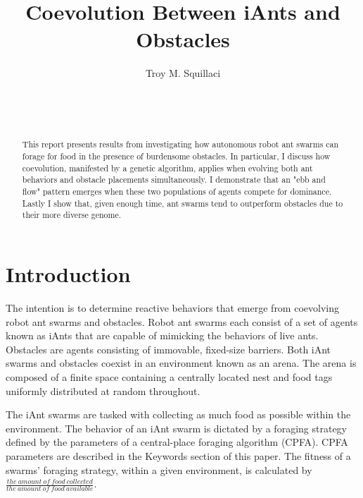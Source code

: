 \documentclass{acm_proc_article-sp}
\begin{document}
\title{Coevolution Between iAnts and Obstacles
}

\author{
\alignauthor
Troy M. Squillaci\\
       \\
       \\
       \\
}

\maketitle

\begin{abstract}

This report presents results from investigating how autonomous robot ant swarms can forage for food in the presence of burdensome obstacles. In particular, I discuss how coevolution, manifested by a genetic algorithm, applies when evolving both ant behaviors and obstacle placements simultaneously. I demonstrate that an "ebb and flow" pattern emerges when these two populations of agents compete for dominance. Lastly I show that, given enough time, ant swarms tend to outperform obstacles due to their more diverse genome.

\end{abstract}

\section{Introduction}
The intention is to determine reactive behaviors that emerge from coevolving robot ant swarms and obstacles. Robot ant swarms each consist of a set of agents known as iAnts that are capable of mimicking the behaviors of live ants. Obstacles are agents consisting of immovable, fixed-size barriers. Both iAnt swarms and obstacles coexist in an environment known as an arena. The arena is composed of a finite space containing a centrally located nest and food tags uniformly distributed at random throughout.

The iAnt swarms are tasked with collecting as much food as possible within the environment. The behavior of an iAnt swarm is dictated by a foraging strategy defined by the parameters of a central-place foraging algorithm (CPFA). CPFA parameters are described in the Keywords section of this paper. The fitness of a swarms' foraging strategy, within a given environment, is calculated by $\frac{the\ amount\ of\ food\ collected}{the\ amount\ of\ food\ available}$.
\end{document}

